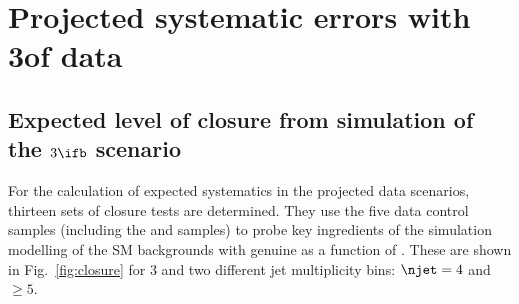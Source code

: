 \clearpage
\section{ Projected systematic errors with 3\ifb of data \label{app:closureTests3fb}}

\subsection{Expected level of closure from simulation of the $3\ifb$ scenario}
\label{sec:closure-mc-study}

For the calculation of expected systematics in the projected data scenarios, 
thirteen sets of closure tests are
determined. They use the five data control samples (including the \ej
and \eej samples) to
probe key ingredients of the simulation modelling of the SM
backgrounds with genuine \met as a function of \scalht. These are
shown in Fig.~\ref{fig:closure} for 3 \ifb %
and two different jet multiplicity bins: $\njet = 4$ and $\geq 5$. 

